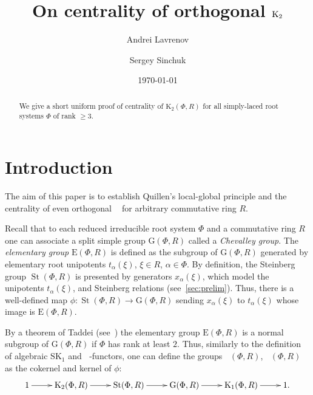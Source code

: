 \documentclass[11pt]{amsart}
\title{On centrality of orthogonal $\Kt$}
\author {Andrei Lavrenov}
\author{Sergey Sinchuk}
\date {\today}
\theoremstyle{plain} \declaretheorem[name=Theorem, Refname={Theorem,Theorems}]{tm} \Crefname{tm}{Theorem}{Theorems}
\numberwithin{equation}{section}
\theoremstyle{definition} \newtheorem{df}[lm]{Definition} \Crefname{df}{Definition}{Definitions}
\theoremstyle{remark} \newtheorem{rk}[lm]{Remark} \Crefname{rk}{Remark}{Remarks}
\newcommand{\E}{{\mathrm{E}}}
\newcommand{\GG}{{\mathrm{G}}}
\newcommand{\St}{\mathop{\mathrm{St}}\nolimits}
\newcommand{\Kt}{\mathop{\mathrm{K_2}}\nolimits}
\newcommand{\Ko}{\mathop{\mathrm{K_1}}\nolimits}
\begin{document}
\begin{abstract} We give a short uniform proof of centrality of $\mathrm K_2(\Phi, R)$ for all simply-laced root systems $\Phi$ of rank $\geq 3$.
\end{abstract}

\maketitle


\section*{Introduction}
The aim of this paper is to establish Quillen's local-global principle and the centrality of even orthogonal $\Kt$ for arbitrary commutative ring $R$.

Recall that to each reduced irreducible root system $\Phi$ and a commutative ring $R$ one can associate a split simple group $\GG(\Phi, R)$ called a \emph{Chevalley group}.
The {\it elementary group} $\E(\Phi, R)$ is defined as the subgroup of $\GG(\Phi, R)$ generated by elementary root unipotents $t_\alpha(\xi)$, $\xi\in R$, $\alpha\in \Phi$.
By definition, the Steinberg group $\St(\Phi, R)$ is presented by generators $x_\alpha(\xi)$, which model the unipotents $t_\alpha(\xi)$, and Steinberg relations (see~\cref{sec:prelim}). 
Thus, there is a well-defined map $\phi\colon\St(\Phi, R)\to \GG(\Phi, R)$ sending $x_\alpha(\xi)$ to $t_\alpha(\xi)$ whose image is $\E(\Phi, R)$.

By a theorem of Taddei (see~\cite{Ta}) the elementary group $\E(\Phi, R)$ is a normal subgroup of $\GG(\Phi, R)$ if $\Phi$ has rank at least $2$.
Thus, similarly to the definition of algebraic $\mathrm{SK}_1$ and $\Kt$-functors, one can define the groups $\Ko(\Phi, R)$, $\Kt(\Phi, R)$ as the cokernel and kernel of $\phi$:
$$\xymatrix{1 \ar[r] & \Kt(\Phi, R) \ar[r] & \St(\Phi, R) \ar[r] & \GG(\Phi, R) \ar[r] & \Ko(\Phi, R) \ar[r] & 1.}$$
\end{document}

